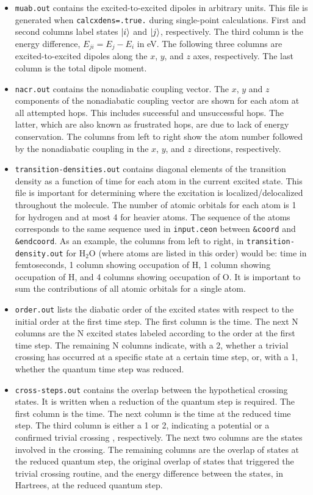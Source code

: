 \documentclass[letterpaper,12pt,titlepage]{article}
\begin{document}
\begin{itemize}
\item \verb+muab.out+ contains the excited-to-excited dipoles in arbitrary units.  This file is generated when \verb+calcxdens=.true.+ during single-point calculations.  First and second columns label states $\ket{i}$ and $\ket{j}$, respectively.  The third column is the energy difference, $E_{ji} = E_{j}-E_{i}$ in eV.  The following three columns are excited-to-excited dipoles along the $x$, $y$, and $z$ axes, respectively.  The last column is the total dipole moment.
\item \verb+nacr.out+ contains the nonadiabatic coupling vector.  The $x$, $y$ and $z$ components of the nonadiabatic coupling vector are shown for each atom at all attempted hops.  This includes successful and unsuccessful hops.  The latter, which are also known as frustrated hops, are due to lack of energy conservation. The columns from left to right show the atom number followed by the nonadiabatic coupling in the $x$, $y$, and $z$ directions, respectively.
\item \verb+transition-densities.out+ contains diagonal elements of the transition density as a function of time for each atom in the current excited state.  This file is important for determining where the excitation is localized/delocalized throughout the molecule.  The number of atomic orbitals for each atom is 1 for hydrogen and at most 4 for heavier atoms.  The sequence of the atoms corresponds to the same sequence used in \verb+input.ceon+ between \verb+&coord+ and \verb+&endcoord+.  As an example, the columns from left to right, in \verb+transition-density.out+ for H$_{2}$O (where atoms are listed in this order) would be: time in femtoseconds, 1 column showing occupation of H, 1 column showing occupation of H, and 4 columns showing occupation of O.  It is important to sum the contributions of all atomic orbitals for a single atom.
\item \verb+order.out+ lists the diabatic order of the excited states with respect to the initial order at the first time step.  The first column is the time.  The next N columns are the N excited states labeled according to the order at the first time step.  The remaining N columns indicate, with a 2, whether a trivial crossing has occurred at a specific state at a certain time step, or, with a 1, whether the quantum time step was reduced.  
\item \verb+cross-steps.out+ contains the overlap between the hypothetical crossing states. It is written when a reduction of the quantum step is required.  The first column is the time.  The next column is the time at the reduced time step.  The third column is either a 1  or 2, indicating a potential or a confirmed trivial crossing , respectively.  The next two columns are the states involved in the crossing.  The remaining columns are the overlap of states at the reduced quantum step, the original overlap of states that triggered the trivial crossing routine, and the energy difference between the states, in Hartrees, at the reduced quantum step.
\end{itemize}
\end{document}
